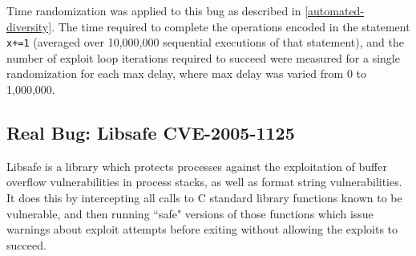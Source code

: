 Time randomization was applied to this bug as described in \autoref{automated-diversity}.
The time required to complete the operations encoded in the statement \texttt{x+=1} (averaged over 10,000,000 sequential executions of that statement), and the number of exploit loop iterations required to succeed were measured for a single randomization for each max delay, where max delay was varied from 0 to 1,000,000.
\subsection{Real Bug: Libsafe CVE-2005-1125}
Libsafe \cite{Tsai2001} is a library which protects processes against the exploitation of buffer overflow vulnerabilities in process stacks, as well as format string vulnerabilities.  It does this by intercepting all calls to C standard library functions known to be vulnerable, and then running ``safe" versions of those functions which issue warnings about exploit attempts before exiting without allowing the exploits to succeed.

